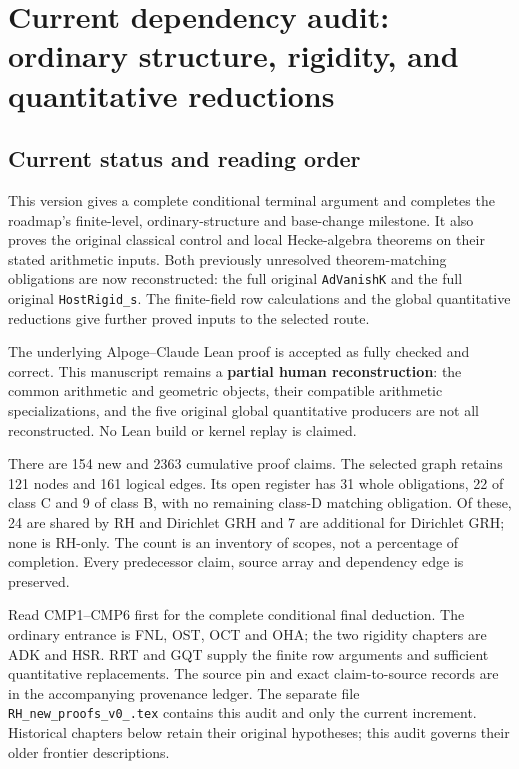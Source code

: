 \section{Current dependency audit: ordinary structure, rigidity, and quantitative reductions}
\label{sec:dependency-audit-v42}

\subsection{Current status and reading order}

This version gives a complete conditional terminal argument and completes
the roadmap's finite-level, ordinary-structure and base-change milestone.
It also proves the original classical control and local Hecke-algebra
theorems on their stated arithmetic inputs. Both previously unresolved
theorem-matching obligations are now reconstructed: the full original
\texttt{Ad\allowbreak Vanish\allowbreak K} and the full original \texttt{Host\allowbreak Rigid\_\allowbreak s}.
The finite-field row calculations and the global quantitative reductions
give further proved inputs to the selected route.

The underlying Alpoge--Claude Lean proof is accepted as fully checked and
correct. This manuscript remains a \textbf{partial human reconstruction}:
the common arithmetic and geometric objects, their compatible arithmetic
specializations, and the five original global quantitative producers are
not all reconstructed. No Lean build or kernel replay is claimed.

There are 154 new and 2363 cumulative proof claims. The selected graph
retains 121 nodes and 161 logical edges. Its open register has 31
whole obligations, 22 of class C and 9 of class B, with no remaining
class-D matching obligation. Of these, 24 are shared by RH and
Dirichlet GRH and 7 are additional for Dirichlet GRH; none is RH-only.
The count is an inventory of scopes, not a percentage of completion.
Every predecessor claim, source array and dependency edge is preserved.

Read CMP1--CMP6 first for the complete conditional final deduction.
The ordinary entrance is FNL, OST, OCT and OHA; the two rigidity chapters
are ADK and HSR. RRT and GQT supply the finite row arguments and sufficient
quantitative replacements. The source pin and exact claim-to-source
records are in the accompanying provenance ledger. The separate file
\texttt{RH\_\allowbreak new\_\allowbreak proofs\_\allowbreak v0\_.\allowbreak tex} contains this audit and only the
current increment. Historical chapters below retain their original
hypotheses; this audit governs their older frontier descriptions.

